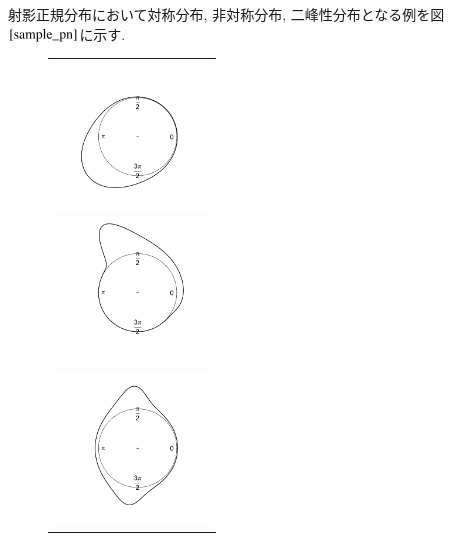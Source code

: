 \documentclass[a4j,11pt]{jarticle}
\begin{document}
射影正規分布において対称分布, 非対称分布, 二峰性分布となる例を図$\ref{sample_pn}$に示す. 

\vspace{-0.5zh}
\begin{figure}[H]
 \begin{tabular}{c}
\hspace{0.5cm}
 \begin{minipage}{0.33\hsize}
  \begin{center}
   \includegraphics[clip,height= 40mm]{data/sample_symmetry.png}
  \end{center}
 \end{minipage}
\hspace{-1.0cm}
 \begin{minipage}{0.33\hsize}
  \begin{center}
 \includegraphics[clip,height= 40mm]{data/sample_asymmetry.png}
  \end{center}
 \end{minipage}
\hspace{-1.0cm}
 \begin{minipage}{0.33\hsize}
  \begin{center}
   \includegraphics[clip,height= 40mm]{data/sample_bimodal.png}
  \end{center}
 \end{minipage}

\end{tabular}
\end{figure}
\end{document}
